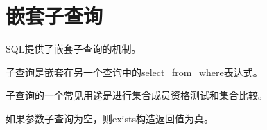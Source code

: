 \section{嵌套子查询}

SQL提供了嵌套子查询的机制。

子查询是嵌套在另一个查询中的select\_from\_where表达式。

子查询的一个常见用途是进行集合成员资格测试和集合比较。

如果参数子查询为空，则exists构造返回值为真。